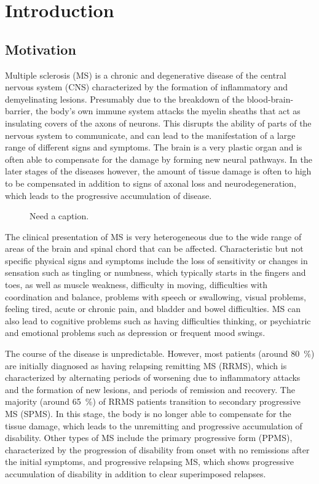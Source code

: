 \chapter{Introduction}


\section{Motivation}

Multiple sclerosis (MS) is a chronic and degenerative disease of the central
nervous system (CNS) characterized by the formation of inflammatory
and demyelinating lesions. Presumably due to the breakdown of the
blood-brain-barrier, the body's own immune system attacks the myelin sheaths
that act as insulating covers of the axons of neurons. This disrupts the ability
of parts of the nervous system to communicate, and can lead to the manifestation
of a large range of different signs and symptoms. The brain is a very plastic
organ and is often able to compensate for the damage by forming new neural
pathways. In the later stages of the diseases however, the amount of tissue
damage is often to high to be compensated in addition to signs of axonal loss
and neurodegeneration, which leads to the progressive accumulation of disease.

\begin{figure}
\caption{Need a caption.}
\end{figure}
 
The clinical presentation of MS is very heterogeneous due to the wide range of
areas of the brain and spinal chord that can be affected. Characteristic but not
specific physical signs and symptoms include the loss of sensitivity or changes
in sensation such as tingling or numbness, which typically starts in the fingers
and toes, as well as muscle weakness, difficulty in moving, difficulties with
coordination and balance, problems with speech or swallowing, visual problems,
feeling tired, acute or chronic pain, and bladder and bowel difficulties. MS can
also lead to cognitive problems such as having difficulties thinking, or
psychiatric and emotional problems such as depression or frequent mood swings.

The course of the disease is unpredictable. However, most patients (around
\SI{80}{\percent}) are initially diagnosed as having relapsing remitting MS
(RRMS), which is characterized by alternating periods of worsening due to
inflammatory attacks and the formation of new lesions, and periods of remission
and recovery. The majority (around \SI{65}{\percent}) of RRMS patients
transition to secondary progressive MS (SPMS). In this stage, the body is no
longer able to compensate for the tissue damage, which leads to the unremitting
and progressive accumulation of disability. Other types of MS include the
primary progressive form (PPMS), characterized by the progression of disability
from onset with no remissions after the initial symptoms, and progressive
relapsing MS, which shows progressive accumulation of disability in addition to
clear superimposed relapses.

